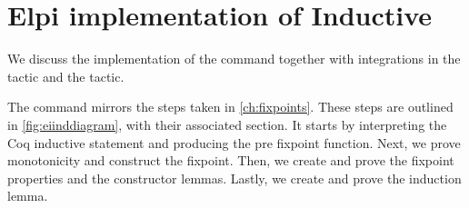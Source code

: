 \documentclass[thesis.tex]{subfiles}
\begin{document}
\VerbatimFootnotes

\chapter{Elpi implementation of Inductive}\label{ch:inductiveimpl}
We discuss the implementation of the  command together with integrations in the  tactic and the  tactic.

The  command mirrors the steps taken in \cref{ch:fixpoints}. These steps are outlined in \cref{fig:eiinddiagram}, with their associated section. It starts by interpreting the Coq inductive statement and producing the pre fixpoint function. Next, we prove monotonicity and construct the fixpoint. Then, we create and prove the fixpoint properties and the constructor lemmas. Lastly, we create and prove the induction lemma.
\end{document}
